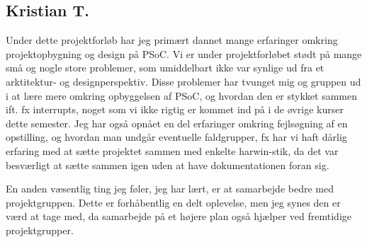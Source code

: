 \subsection{Kristian T.}
Under dette projektforløb har jeg primært dannet mange erfaringer omkring projektopbygning og design på PSoC.
Vi er under projektforløbet stødt på mange små og nogle store problemer, som umiddelbart ikke var synlige ud fra et arktitektur- og designperspektiv.
Disse problemer har tvunget mig og gruppen ud i at lære mere omkring opbyggelsen af PSoC, og hvordan den er stykket sammen ift. fx interrupts, noget som vi ikke rigtig er kommet ind på i de øvrige kurser dette semester.
Jeg har også opnået en del erfaringer omkring fejlsøgning af en opstilling, og hvordan man undgår eventuelle faldgrupper, fx har vi haft dårlig erfaring med at sætte projektet sammen med enkelte harwin-stik, da det var besværligt at sætte sammen igen uden at have dokumentationen foran sig.

En anden væsentlig ting jeg føler, jeg har lært, er at samarbejde bedre med projektgruppen.
Dette er forhåbentlig en delt oplevelse, men jeg synes den er værd at tage med, da samarbejde på et højere plan også hjælper ved fremtidige projektgrupper.

